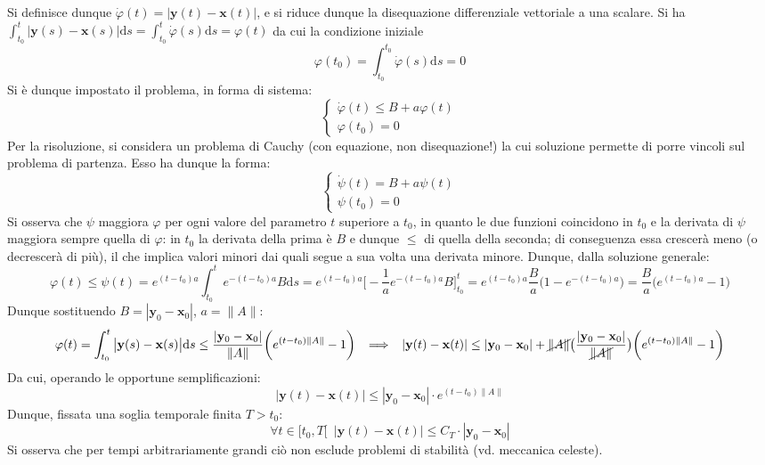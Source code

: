 \documentclass[10pt]{article}
\theoremstyle{plain}
\begin{document}
Si definisce dunque $\displaystyle \dot{\varphi}(t) = \big|\mathbf{y}(t) - \mathbf{x}(t)\big|$, e si riduce dunque la disequazione differenziale vettoriale a una scalare. Si ha $\displaystyle \int_{t_0}^{t} \big| \mathbf{y}(s) - \mathbf{x}(s)\big| \textrm{d}s = \int_{t_0}^{t} \dot{\varphi}(s)\textrm{d}s = \varphi(t)$ da cui la condizione iniziale
\[\varphi(t_0) = \int_{t_0}^{t_0} \dot{\varphi}(s) \textrm{d}s = 0\]
Si è dunque impostato il problema, in forma di sistema:
\[\begin{cases}
\dot{\varphi}(t) \leq B + a \varphi(t)\\
\varphi(t_0) = 0
\end{cases}\]
Per la risoluzione, si considera un problema di Cauchy (con equazione, non disequazione!) la cui soluzione permette di porre vincoli sul problema di partenza. Esso ha dunque la forma:
\[\begin{cases}
\dot{\psi}(t) = B + a \psi(t)\\
\psi(t_0) = 0
\end{cases}\]
Si osserva che $\psi$ maggiora $\varphi$ per ogni valore del parametro $t$ superiore a $t_0$, in quanto le due funzioni coincidono in $t_0$ e la derivata di $\psi$ maggiora sempre quella di $\varphi$: in $t_0$ la derivata della prima è $B$ e dunque $\leq$ di quella della seconda; di conseguenza essa crescerà meno (o decrescerà di più), il che implica valori minori dai quali segue a sua volta una derivata minore. Dunque, dalla soluzione generale:
\[\varphi(t) \leq \psi(t) = e^{(t - t_0) a} \int_{t_0}^{t}e^{- (t - t_0) a}B \textrm{d}s = e^{(t - t_0) a} \bigg[-\frac{1}{a}e^{- (t - t_0) a} B\bigg]_{t_0}^t = e^{(t - t_0) a} \frac{B}{a} \big(1 - e^{- (t - t_0) a}\big) = \frac{B}{a}\big(e^{(t - t_0) a} - 1\big)\]
Dunque sostituendo $\displaystyle B = |\mathbf{y}_0 - \mathbf{x}_0|$, $a = \|A\|$:
\[\varphi(t) = \int_{t_0}^{t} \big| \mathbf{y}(s) - \mathbf{x}(s)\big| \textrm{d}s \leq \frac{|\mathbf{y}_0 - \mathbf{x}_0|}{\|A\|} \bigg(e^{(t - t_0) \|A\|} - 1\bigg) \enspace \implies \enspace |\mathbf{y}(t) - \mathbf{x}(t)| \leq |\mathbf{y}_0 - \mathbf{x}_0| + \cancel{\|A\|} \big(\frac{|\mathbf{y}_0 - \mathbf{x}_0|}{\cancel{\|A\|}}\big)\bigg(e^{(t - t_0) \|A\|} - 1\bigg)\]
Da cui, operando le opportune semplificazioni:
\[|\mathbf{y}(t) - \mathbf{x}(t)| \leq |\mathbf{y}_0 - \mathbf{x}_0| \cdot e^{(t - t_0) \|A\|}\]
Dunque, fissata una soglia temporale finita $T > t_0$:
\[\forall t \in [t_0, T[ \enspace |\mathbf{y}(t) - \mathbf{x}(t)| \leq C_T \cdot |\mathbf{y}_0 - \mathbf{x}_0|\]
Si osserva che per tempi arbitrariamente grandi ciò non esclude problemi di stabilità (vd. meccanica celeste).
\end{document}
